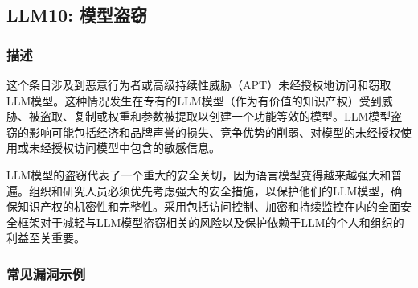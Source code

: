 \documentclass[
]{article}
\author{}
\date{}
\begin{document}
\subsection{LLM10: 模型盗窃}\label{llm10-ux6a21ux578bux76d7ux7a83}

\subsubsection{描述}\label{ux63cfux8ff0}

这个条目涉及到恶意行为者或高级持续性威胁（APT）未经授权地访问和窃取LLM模型。这种情况发生在专有的LLM模型（作为有价值的知识产权）受到威胁、被盗取、复制或权重和参数被提取以创建一个功能等效的模型。LLM模型盗窃的影响可能包括经济和品牌声誉的损失、竞争优势的削弱、对模型的未经授权使用或未经授权访问模型中包含的敏感信息。

LLM模型的盗窃代表了一个重大的安全关切，因为语言模型变得越来越强大和普遍。组织和研究人员必须优先考虑强大的安全措施，以保护他们的LLM模型，确保知识产权的机密性和完整性。采用包括访问控制、加密和持续监控在内的全面安全框架对于减轻与LLM模型盗窃相关的风险以及保护依赖于LLM的个人和组织的利益至关重要。

\subsubsection{常见漏洞示例}\label{ux5e38ux89c1ux6f0fux6d1eux793aux4f8b}
\end{document}
